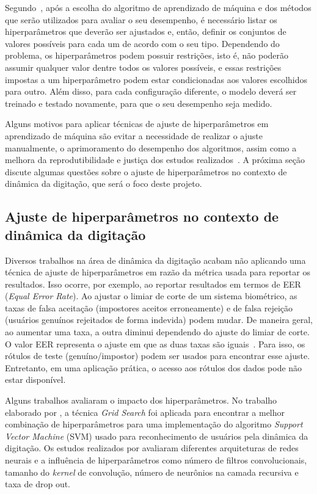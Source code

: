 Segundo~, após a escolha do algoritmo de aprendizado de máquina e dos métodos que serão utilizados para avaliar o seu desempenho, é necessário listar os hiperparâmetros que deverão ser ajustados e, então, definir os conjuntos de valores possíveis para cada um de acordo com o seu tipo. Dependendo do problema, os hiperparâmetros podem possuir restrições, isto é, não poderão assumir qualquer valor dentre todos os valores possíveis, e essas restrições impostas a um hiperparâmetro podem estar condicionadas aos valores escolhidos para outro. Além disso, para cada configuração diferente, o modelo deverá ser treinado e testado novamente, para que o seu desempenho seja medido.

Alguns motivos para aplicar técnicas de ajuste de hiperparâmetros em aprendizado de máquina são evitar a necessidade de realizar o ajuste manualmente, o aprimoramento do desempenho dos algoritmos, assim como a melhora da reprodutibilidade e justiça dos estudos realizados~. A próxima seção discute algumas questões sobre o ajuste de hiperparâmetros no contexto de dinâmica da digitação, que será o foco deste projeto.


\subsection{Ajuste de hiperparâmetros no contexto de dinâmica da digitação}
\label{trabalhos_relacionados}

Diversos trabalhos na área de dinâmica da digitação acabam não aplicando uma técnica de ajuste de hiperparâmetros em razão da métrica usada para reportar os resultados. Isso ocorre, por exemplo, ao reportar resultados em termos de EER (\textit{Equal Error Rate}). Ao ajustar o limiar de corte de um sistema biométrico, as taxas de falsa aceitação (impostores aceitos erroneamente) e de falsa rejeição (usuários genuínos rejeitados de forma indevida) podem mudar. De maneira geral, ao aumentar uma taxa, a outra diminui dependendo do ajuste do limiar de corte. O valor EER representa o ajuste em que as duas taxas são iguais~\cite{Roy2022systematic}. Para isso, os rótulos de teste (genuíno/impostor) podem ser usados para encontrar esse ajuste. Entretanto, em uma aplicação prática, o acesso aos rótulos dos dados pode não estar disponível.

Alguns trabalhos avaliaram o impacto dos hiperparâmetros. No trabalho elaborado por , a técnica \textit{Grid Search} foi aplicada para encontrar a melhor combinação de hiperparâmetros para uma implementação do algoritmo \textit{Support Vector Machine} (SVM) usado para reconhecimento de usuários pela dinâmica da digitação. Os estudos realizados por  avaliaram diferentes arquiteturas de redes neurais e a influência de hiperparâmetros como número de filtros convolucionais, tamanho do \textit{kernel} de convolução, número de neurônios na camada recursiva e taxa de drop out.

